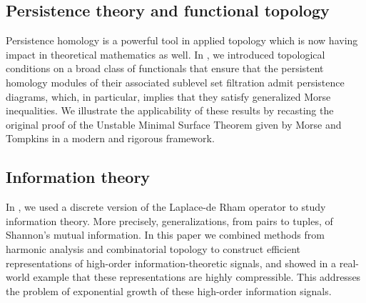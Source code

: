 \subsection{Persistence theory and functional topology}

Persistence homology is a powerful tool in applied topology which is now having impact in theoretical mathematics as well.
In \cite{medina2022fuct_top}, we introduced topological conditions on a broad class of functionals that ensure that the persistent homology modules of their associated sublevel set filtration admit persistence diagrams, which, in particular, implies that they satisfy generalized Morse inequalities. We illustrate the applicability of these results by recasting the original proof of the Unstable Minimal Surface Theorem given by Morse and Tompkins in a modern and rigorous framework.

\subsection{Information theory}

In \cite{medina2021hyperharmonic}, we used a discrete version of the Laplace-de Rham operator to study information theory.
More precisely, generalizations, from pairs to tuples, of Shannon's mutual information.
In this paper we combined methods from harmonic analysis and combinatorial topology to construct efficient representations of high-order information-theoretic signals, and showed in a real-world example that these representations are highly compressible.
This addresses the problem of exponential growth of these high-order information signals.
